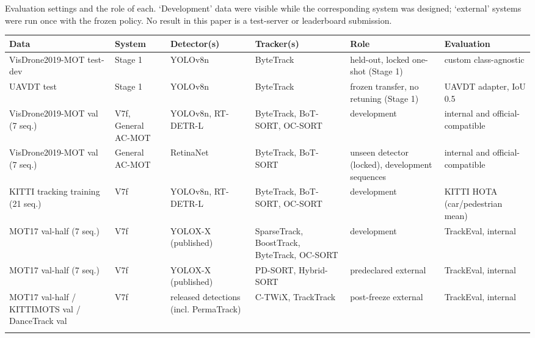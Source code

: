 \begin{tableorg}[!htbp]
\centering
\caption{Evaluation settings and the role of each. `Development' data were visible while the corresponding system was designed; `external' systems were run once with the frozen policy. No result in this paper is a test-server or leaderboard submission.}
\label{tab:protocol}
\footnotesize
\setlength\tabcolsep{3.5pt}
\begin{adjustbox}{max width=\linewidth}
\begin{tabular}{p{2.5cm}p{1.5cm}p{1.9cm}p{2.2cm}p{2.3cm}p{2.0cm}}
\toprule
Data & System & Detector(s) & Tracker(s) & Role & Evaluation \\
\midrule
VisDrone2019-MOT test-dev & Stage 1 & YOLOv8n & ByteTrack & held-out, locked one-shot (Stage 1) & custom class-agnostic \\
UAVDT test & Stage 1 & YOLOv8n & ByteTrack & frozen transfer, no retuning (Stage 1) & UAVDT adapter, IoU 0.5 \\
VisDrone2019-MOT val (7 seq.) & V7f, General AC-MOT & YOLOv8n, RT-DETR-L & ByteTrack, BoT-SORT, OC-SORT & development & internal and official-compatible \\
VisDrone2019-MOT val (7 seq.) & General AC-MOT & RetinaNet & ByteTrack, BoT-SORT & unseen detector (locked), development sequences & internal and official-compatible \\
KITTI tracking training (21 seq.) & V7f & YOLOv8n, RT-DETR-L & ByteTrack, BoT-SORT, OC-SORT & development & KITTI HOTA (car/pedestrian mean) \\
MOT17 val-half (7 seq.) & V7f & YOLOX-X (published) & SparseTrack, BoostTrack, ByteTrack, OC-SORT & development & TrackEval, internal \\
MOT17 val-half (7 seq.) & V7f & YOLOX-X (published) & PD-SORT, Hybrid-SORT & predeclared external & TrackEval, internal \\
MOT17 val-half / KITTIMOTS val / DanceTrack val & V7f & released detections (incl. PermaTrack) & C-TWiX, TrackTrack & post-freeze external & TrackEval, internal \\
\botrule
\end{tabular}
\end{adjustbox}
\end{tableorg}
